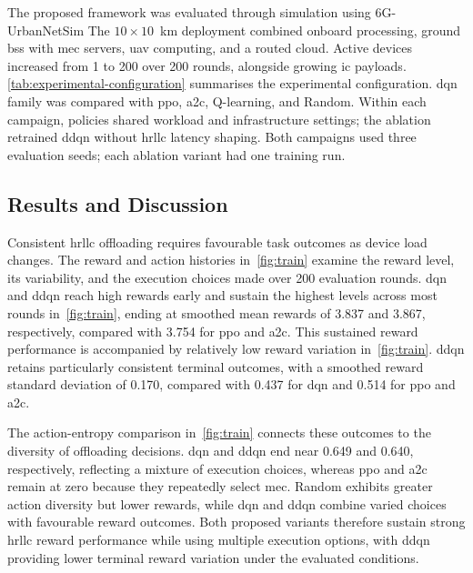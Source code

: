 \documentclass[journal]{IEEEtran}
\newcommand{\Subfigref}[2]{\mbox{\autoref{#1}\subref{#2}}}
\begin{document}
The proposed framework was evaluated through simulation using 6G-UrbanNetSim The $10\times10$~km deployment combined onboard processing, ground \ac{bs}s with \ac{mec} servers, \ac{uav} computing, and a routed cloud. Active devices increased from 1 to 200 over 200 rounds, alongside growing \ac{ic} payloads. \autoref{tab:experimental-configuration} summarises the experimental configuration. \ac{dqn} family was compared with \ac{ppo}, \ac{a2c}, Q-learning, and Random. Within each campaign, policies shared workload and infrastructure settings; the ablation retrained \ac{ddqn} without \ac{hrllc} latency shaping. Both campaigns used three evaluation seeds; each ablation variant had one training run. 





\subsection{Results and Discussion}
\label{subsec:results-discussion}




Consistent \ac{hrllc} offloading requires favourable task outcomes as device load changes. The reward and action histories in~\autoref{fig:train} examine the reward level, its variability, and the execution choices made over 200 evaluation rounds.
%
\ac{dqn} and \ac{ddqn} reach high rewards early and sustain the highest levels across most rounds in~\Subfigref{fig:train}{fig:train-reward}, ending at smoothed mean rewards of 3.837 and 3.867, respectively, compared with 3.754 for \ac{ppo} and \ac{a2c}.
%
This sustained reward performance is accompanied by relatively low reward variation in~\Subfigref{fig:train}{fig:train-std}. \ac{ddqn} retains particularly consistent terminal outcomes, with a smoothed reward standard deviation of 0.170, compared with 0.437 for \ac{dqn} and 0.514 for \ac{ppo} and \ac{a2c}.
%

The action-entropy comparison in~\Subfigref{fig:train}{fig:train-entropy} connects these outcomes to the diversity of offloading decisions. \ac{dqn} and \ac{ddqn} end near 0.649 and 0.640, respectively, reflecting a mixture of execution choices, whereas \ac{ppo} and \ac{a2c} remain at zero because they repeatedly select \ac{mec}. Random exhibits greater action diversity but lower rewards, while \ac{dqn} and \ac{ddqn} combine varied choices with favourable reward outcomes.
%
Both proposed variants therefore sustain strong \ac{hrllc} reward performance while using multiple execution options, with \ac{ddqn} providing lower terminal reward variation under the evaluated conditions.
\end{document}
